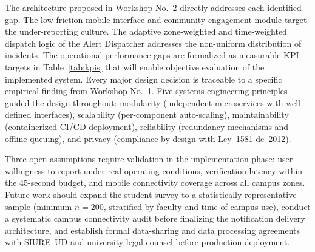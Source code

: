 \documentclass[12pt, oneside]{article}
\begin{document}
The architecture proposed in Workshop No.~2 directly addresses each identified gap.
The low-friction mobile interface and community engagement module target the
under-reporting culture. The adaptive zone-weighted and time-weighted dispatch logic
of the Alert Dispatcher addresses the non-uniform distribution of incidents. The
operational performance gaps are formalized as measurable KPI targets in
Table~\ref{tab:kpis} that will enable objective evaluation of the implemented system.
Every major design decision is traceable to a specific empirical finding from
Workshop No.~1. Five systems engineering principles guided the design throughout:
modularity (independent microservices with well-defined interfaces), scalability
(per-component auto-scaling), maintainability (containerized CI/CD deployment),
reliability (redundancy mechanisms and offline queuing), and privacy
(compliance-by-design with Ley~1581 de~2012).

Three open assumptions require validation in the implementation phase: user willingness
to report under real operating conditions, verification latency within the 45-second
budget, and mobile connectivity coverage across all campus zones. Future work should
expand the student survey to a statistically representative sample (minimum $n = 200$,
stratified by faculty and time of campus use), conduct a systematic campus connectivity
audit before finalizing the notification delivery architecture, and establish formal
data-sharing and data processing agreements with SIURE~UD and university legal counsel
before production deployment.
\end{document}
